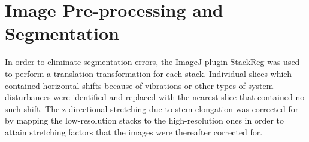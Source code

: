 
\section[Processed Image data]{Image Pre-processing and Segmentation}
In order to eliminate segmentation errors, the ImageJ plugin StackReg was used
to perform a translation transformation for each stack. Individual slices which
contained horizontal shifts because of vibrations or other types of system
disturbances were identified and replaced with the nearest slice that contained
no such shift. The z-directional stretching due to stem elongation was corrected for by mapping
the low-resolution stacks to the high-resolution ones in order to attain
stretching factors that the images were thereafter corrected for. 

